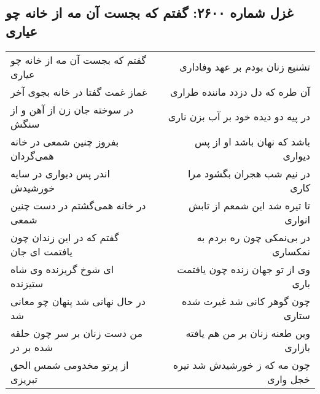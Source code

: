 \begin{center}
\section*{غزل شماره ۲۶۰۰: گفتم که بجست آن مه از خانه چو عیاری}
\label{sec:2600}
\begin{longtable}{l p{0.5cm} r}
گفتم که بجست آن مه از خانه چو عیاری
&&
تشنیع زنان بودم بر عهد وفاداری
\\
غماز غمت گفتا در خانه بجوی آخر
&&
آن طره که دل دزدد ماننده طراری
\\
در سوخته جان زن از آهن و از سنگش
&&
در پیه دو دیده خود بر آب بزن ناری
\\
بفروز چنین شمعی در خانه همی‌گردان
&&
باشد که نهان باشد او از پس دیواری
\\
اندر پس دیواری در سایه خورشیدش
&&
در نیم شب هجران بگشود مرا کاری
\\
در خانه همی‌گشتم در دست چنین شمعی
&&
تا تیره شد این شمعم از تابش انواری
\\
گفتم که در این زندان چون یافتمت ای جان
&&
در بی‌نمکی چون ره بردم به نمکساری
\\
ای شوخ گریزنده وی شاه ستیزنده
&&
وی از تو جهان زنده چون یافتمت باری
\\
در حال نهانی شد پنهان چو معانی شد
&&
چون گوهر کانی شد غیرت شده ستاری
\\
من دست زنان بر سر چون حلقه شده بر در
&&
وین طعنه زنان بر من هم یافته بازاری
\\
از پرتو مخدومی شمس الحق تبریزی
&&
چون مه که ز خورشیدش شد تیره خجل واری
\\
\end{longtable}
\end{center}

